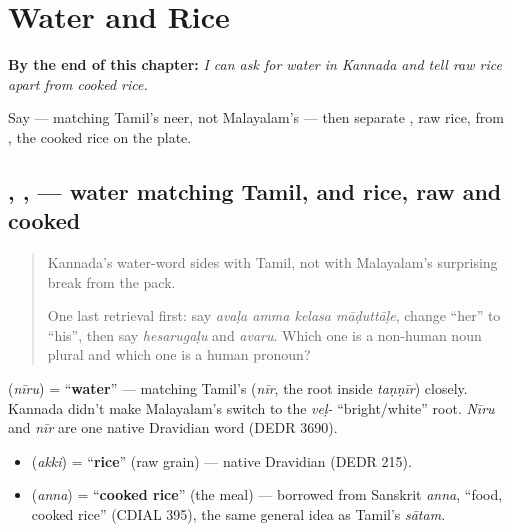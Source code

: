
\chapter{Water and Rice}
\label{ch:ka-water-and-rice}

\begin{chapteropening}
\textbf{By the end of this chapter:} \emph{I can ask for water in Kannada and tell raw rice apart from cooked rice.}

Say  — matching Tamil's neer, not Malayalam's — then separate , raw rice, from , the cooked rice on the plate.
\end{chapteropening}

\section[\texorpdfstring{\kn{ನೀರು} \kn{ಅಕ್ಕಿ} \kn{ಅನ್ನ} (nīru akki anna)}{ನೀರು ಅಕ್ಕಿ ಅನ್ನ (nīru akki anna)}]{, ,  — water matching Tamil, and rice, raw and cooked}

\label{lesson:KA-C15-niiru-akki}



\begin{quote}
Kannada's water-word sides with Tamil, not with Malayalam's surprising break from the pack.

One last retrieval first: say \emph{avaḷa amma kelasa māḍuttāḷe}, change “her” to “his”, then say \emph{hesarugaḷu} and \emph{avaru}. Which one is a non-human noun plural and which one is a human pronoun?
\end{quote}

\begin{cousinweb}
\textbf{} (\emph{nīru}) = \textquotedblleft{}\textbf{water}\textquotedblright{} — matching Tamil's \textbf{} (\emph{nīr}, the root inside \emph{taṇṇīr}) closely. Kannada didn't make Malayalam's switch to the \emph{veḷ-} \textquotedblleft{}bright/white\textquotedblright{} root. \emph{Nīru} and \emph{nīr} are one native Dravidian word (DEDR 3690).
\end{cousinweb}

\begin{cousinweb}
\begin{itemize}
\raggedright
  \item \textbf{} (\emph{akki}) = \textquotedblleft{}\textbf{rice}\textquotedblright{} (raw grain) — native Dravidian (DEDR 215).
  \item \textbf{} (\emph{anna}) = \textquotedblleft{}\textbf{cooked rice}\textquotedblright{} (the meal) — borrowed from Sanskrit \emph{anna}, \textquotedblleft{}food, cooked rice\textquotedblright{} (CDIAL 395), the same general idea as Tamil's \emph{sātam}.
\end{itemize}
\end{cousinweb}

